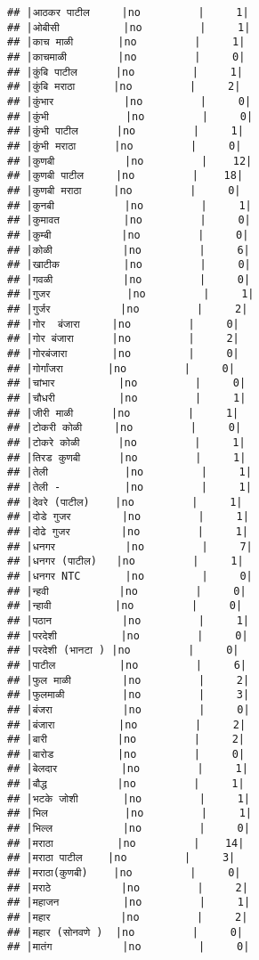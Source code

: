 \documentclass[
]{article}
\begin{document}
\begin{verbatim}
## |आठकर पाटील     |no         |     1|
## |ओबीसी          |no         |     1|
## |काच माळी       |no         |     1|
## |काचमाळी        |no         |     0|
## |कुंबि पाटील      |no         |     1|
## |कुंबि मराठा      |no         |     2|
## |कुंभार           |no         |     0|
## |कुंभी            |no         |     0|
## |कुंभी पाटील      |no         |     1|
## |कुंभी मराठा      |no         |     0|
## |कुणबी           |no         |    12|
## |कुणबी पाटील     |no         |    18|
## |कुणबी मराठा     |no         |     0|
## |कुनबी           |no         |     1|
## |कुमावत          |no         |     0|
## |कुम्बी           |no         |     0|
## |कोळी           |no         |     6|
## |खाटीक          |no         |     0|
## |गवळी           |no         |     0|
## |गुजर            |no         |     1|
## |गुर्जर           |no         |     2|
## |गोर  बंजारा     |no         |     0|
## |गोर बंजारा      |no         |     2|
## |गोरबंजारा       |no         |     0|
## |गोर्गांजरा       |no         |     0|
## |चांभार          |no         |     0|
## |चौधरी          |no         |     1|
## |जीरी माळी      |no         |     1|
## |टोकरी कोळी     |no         |     0|
## |टोकरे कोळी      |no         |     1|
## |तिरड कुणबी      |no         |     1|
## |तेली            |no         |     1|
## |तेली -          |no         |     1|
## |देवरे (पाटील)    |no         |     1|
## |दोडे गुजर        |no         |     1|
## |दोढे गुजर        |no         |     1|
## |धनगर           |no         |     7|
## |धनगर (पाटील)   |no         |     1|
## |धनगर NTC       |no         |     0|
## |न्हवी           |no         |     0|
## |न्हावी          |no         |     0|
## |पठान           |no         |     1|
## |परदेशी          |no         |     0|
## |परदेशी (भानटा ) |no         |     0|
## |पाटील          |no         |     6|
## |फुल माळी        |no         |     2|
## |फुलमाळी         |no         |     3|
## |बंजरा           |no         |     0|
## |बंजारा          |no         |     2|
## |बारी           |no         |     2|
## |बारोड          |no         |     0|
## |बेलदार          |no         |     1|
## |बौद्ध           |no         |     1|
## |भटके जोशी       |no         |     1|
## |भिल            |no         |     1|
## |भिल्ल           |no         |     0|
## |मराठा          |no         |    14|
## |मराठा पाटील    |no         |     3|
## |मराठा(कुणबी)    |no         |     0|
## |मराठे           |no         |     2|
## |महाजन          |no         |     1|
## |महार           |no         |     2|
## |महार (सोनवणे )  |no         |     0|
## |मातंग           |no         |     0|

\end{verbatim}
\end{document}
